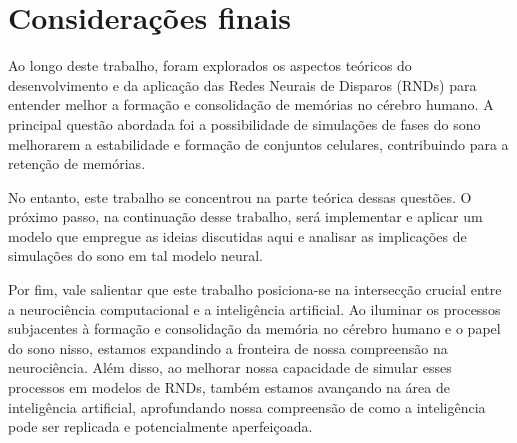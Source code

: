 \chapter{Considerações finais}

Ao longo deste trabalho, foram explorados os aspectos teóricos do desenvolvimento e da aplicação das Redes Neurais de Disparos
(RNDs) para entender melhor a formação e consolidação de memórias no cérebro humano. A principal questão abordada foi a
possibilidade de simulações de fases do sono melhorarem a estabilidade e formação de conjuntos celulares, contribuindo para a
retenção de memórias. 

No entanto, este trabalho se concentrou na parte teórica dessas questões. O próximo passo, na continuação desse trabalho, será
implementar e aplicar um modelo que empregue as ideias discutidas aqui e analisar as implicações de simulações do sono em tal
modelo neural.

Por fim, vale salientar que este trabalho posiciona-se na intersecção crucial entre a neurociência computacional e a inteligência
artificial. Ao iluminar os processos subjacentes à formação e consolidação da memória no cérebro humano e o papel do sono nisso,
estamos expandindo a fronteira de nossa compreensão na neurociência. Além disso, ao melhorar nossa capacidade de simular esses
processos em modelos de RNDs, também estamos avançando na área de inteligência artificial, aprofundando nossa compreensão de como
a inteligência pode ser replicada e potencialmente aperfeiçoada. 


